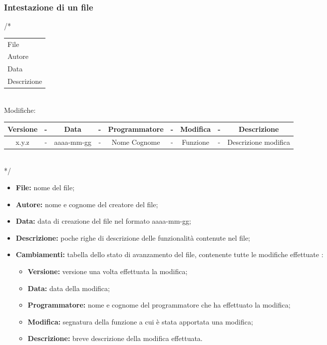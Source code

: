 \newpage
\subsubsection{Intestazione di un file}

\begin{flushleft}

/*\\
\vspace{3mm}
\begin{tabular}{l}
	File\\
	Autore\\
	Data\\
	Descrizione\\
\end{tabular}\\
\vspace{5mm}
 Modifiche:\\
 \vspace{3mm}
\begin{tabular}{| c c c c c c c c c |}
	\hline
	Versione & - & Data & - & Programmatore & - & Modifica & - & Descrizione\\
	\hline
	x.y.z & - & aaaa-mm-gg & - & Nome Cognome & - & Funzione & - & Descrizione modifica\\
	\hline
\end{tabular}\\
\vspace{3mm}
*/\\

\end{flushleft}

\begin{itemize}
	\item \textbf{File:} nome del file;
	\item \textbf{Autore:} nome e cognome del creatore del file;
	\item \textbf{Data:} data di creazione del file nel formato aaaa-mm-gg;
	\item \textbf{Descrizione:} poche righe di descrizione delle funzionalità contenute nel file;
	\item \textbf{Cambiamenti:} tabella dello stato di avanzamento del file, contenente tutte le modifiche effettuate :
		\begin{itemize}
			\item \textbf{Versione:} versione una volta effettuata la modifica;
			\item \textbf{Data:} data della modifica;
			\item \textbf{Programmatore:} nome e cognome del programmatore che ha effettuato la modifica;
			\item \textbf{Modifica:} segnatura della funzione a cui è stata apportata una modifica;
			\item \textbf{Descrizione:} breve descrizione della modifica effettuata.
		\end{itemize}
\end{itemize}


